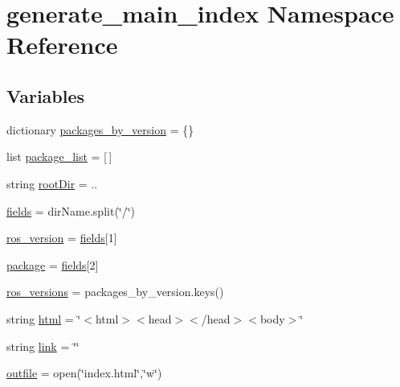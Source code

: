 \hypertarget{namespacegenerate__main__index}{}\section{generate\+\_\+main\+\_\+index Namespace Reference}
\label{namespacegenerate__main__index}
\subsection*{Variables}
\begin{DoxyCompactItemize}
\item 
dictionary \hyperlink{namespacegenerate__main__index_a2ffb2fe092a0f799126e8de4a5b7b27b}{packages\+\_\+by\+\_\+version} = \{\}
\item 
list \hyperlink{namespacegenerate__main__index_a0ad453a98c17595c6a84bec788df10e1}{package\+\_\+list} = \mbox{[}$\,$\mbox{]}
\item 
string \hyperlink{namespacegenerate__main__index_ac24a79171a155105868ec907224dcf0b}{root\+Dir} = \textquotesingle{}..\textquotesingle{}
\item 
\hyperlink{namespacegenerate__main__index_a6a2a34fa223d797862d3574a4de18caf}{fields} = dir\+Name.\+split(\char`\"{}/\char`\"{})
\item 
\hyperlink{namespacegenerate__main__index_af86b04596a38d3282cd704e560fe5bfc}{ros\+\_\+version} = \hyperlink{namespacegenerate__main__index_a6a2a34fa223d797862d3574a4de18caf}{fields}\mbox{[}1\mbox{]}
\item 
\hyperlink{namespacegenerate__main__index_a9d2771b2e20dd95da1e60bc44477f548}{package} = \hyperlink{namespacegenerate__main__index_a6a2a34fa223d797862d3574a4de18caf}{fields}\mbox{[}2\mbox{]}
\item 
\hyperlink{namespacegenerate__main__index_abda9b1c65748837fa9525c5cbb46292c}{ros\+\_\+versions} = packages\+\_\+by\+\_\+version.\+keys()
\item 
string \hyperlink{namespacegenerate__main__index_a5d220637cf46430b8734a695b6c91a5d}{html} = \char`\"{}$<$html$>$$<$head$>$$<$/head$>$$<$body$>$\char`\"{}
\item 
string \hyperlink{namespacegenerate__main__index_a1478cc32da5040538a6325c8e4ddd25c}{link} = \char`\"{}\char`\"{}
\item 
\hyperlink{namespacegenerate__main__index_a19a514ee39deee84f7fd96349f2f0ee3}{outfile} = open(\char`\"{}index.\+html\char`\"{},\char`\"{}w\char`\"{})
\end{DoxyCompactItemize}


